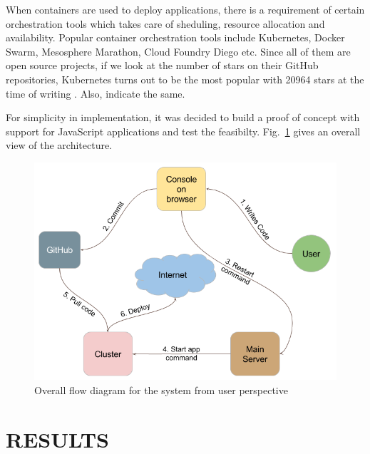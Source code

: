 \documentclass[DD]{iitmdiss}
\begin{document}
When containers are used to deploy applications, there is a requirement of certain orchestration tools which takes care of sheduling, resource allocation and availability. Popular container orchestration tools include Kubernetes, Docker Swarm, Mesosphere Marathon, Cloud Foundry Diego etc. Since all of them are open source projects, if we look at the number of stars on their GitHub repositories, Kubernetes turns out to be the most popular with 20964 stars at the time of writing \citep{github_stars_comparison}. Also, \cite{google_trends_kubernetes_docker_swarm} indicate the same.

For simplicity in implementation, it was decided to build a proof of concept with support for JavaScript applications and test the feasibilty. Fig.~\ref{fig:userflow} gives an overall view of the architecture.

\begin{figure}
\centering
\includegraphics[width=0.7\linewidth]{img/user_flow}
\caption[Overall flow diagram for the system]{Overall flow diagram for the system from user perspective}
\label{fig:userflow}
\end{figure}

\chapter{RESULTS}

\end{document}
